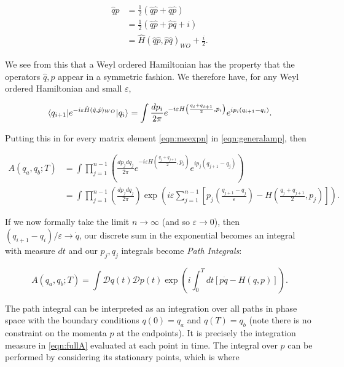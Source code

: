 \begin{equation}
\begin{split}
\hat{q} \hat{p} &= \frac{1}{2}( \hat{q} \hat{p} + \hat{q} \hat{p}) \\
&= \frac{1}{2}(\hat{q} \hat{p} + \hat{p} \hat{q} + i) \\
&= \hat{H}(\hat{q} \hat{p}, \hat{p} \hat{q})_{WO} + \frac{i}{2}. 
\end{split}
\end{equation}

We see from this that a Weyl ordered Hamiltonian has the property that the operators $\hat{q}, \hat{p}$ appear in a symmetric fashion. We therefore have, for any Weyl ordered Hamiltonian and small $\varepsilon$,

\begin{equation}
\mathinner{\langle q_{i+1}\vert e^{-i \varepsilon \hat{H}(\hat{q}, \hat{p})_{WO}}\vert q_i\rangle}_{} = \int \frac{d p_i}{2 \pi} e^{- i \varepsilon H\left(\frac{q_i + q_{i+1}}{2}, p_i\right)}e^{i p_i(q_{i+1} - q_i)}.
\end{equation}

Putting this in for every matrix element \ref{eqn:meexpn} in \ref{eqn:generalamp}, then

\begin{equation}
\label{eqn:fullA}
\begin{split}
A(q_a,q_b;T) &= \int \prod_{j=1}^{n-1} \left(\frac{dp_j dq_j}{2 \pi} e^{- i \varepsilon H\left(\frac{q_j + q_{j+1}}{2}, p_i\right)}e^{i p_j(q_{j+1} - q_j)}\right) \\
&= \int \prod_{j=1}^{n-1} \left(\frac{dp_j dq_j}{2 \pi} \right) \exp \left(i \varepsilon \sum_{j=1}^{n-1} \left[ p_j \left(\frac{q_{j+1}-q_j}{\varepsilon}\right) - H \left( \frac{q_j + q_{j+1}}{2}, p_j \right) \right] \right).
\end{split}
\end{equation} 

If we now formally take the limit $n \to \infty $ (and so $\varepsilon \to 0$), then $(q_{i+1}-q_i)/\varepsilon \to \dot{q}$, our discrete sum in the exponential becomes an integral with measure $dt$ and our $p_j, q_j$ integrals become \emph{Path Integrals}:

\begin{equation}
A(q_a, q_b; T) = \int \mathcal{D}q(t) \mathcal{D}p(t) \exp \left(i \int_0^T dt [p \dot{q} - H(q,p)] \right).
\end{equation}

The path integral can be interpreted as an integration over all paths in phase space with the boundary conditions $q(0) = q_a$ and $q(T) = q_b$ (note there is no constraint on the momenta $p$ at the endpoints). It is precisely the integration measure in \ref{eqn:fullA} evaluated at each point in time. The integral over $p$ can be performed by considering its stationary points, which is where

